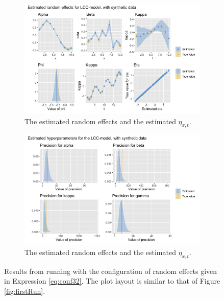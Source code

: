 \begin{figure}[h!]
    \centering
    \begin{subfigure}[b]{0.85\textwidth}
        \centering
        \includegraphics[width=\textwidth]{synthetic-data/Figures/effects-LCC-synthetic-3-2.png}
        \caption{The estimated random effects and the estimated $\eta_{x,t}$.}
        \label{fig:conf32-top}
    \end{subfigure}
    
    \begin{subfigure}[b]{0.6\textwidth}
        \centering
        \includegraphics[width=\textwidth]{synthetic-data/Figures/hyperparameters-LCC-synthetic-3-2.png}
        \caption{The estimated random effects and the estimated $\eta_{x,t}$.}
        \label{fig:conf32-bottom}
    \end{subfigure}
    \caption{Results from running \inlabru with the configuration of random effects given in Expression \ref{eq:conf32}. The plot layout is similar to that of Figure \ref{fig:firstRun}.}
    \label{fig:conf32}
\end{figure}
